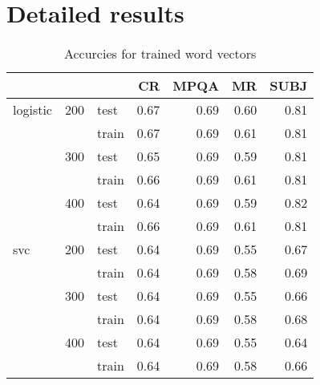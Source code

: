 \chapter{Detailed results}
\label{appendix:detailed}

\begin{table}[h]
\begin{center}

\begin{tabular}{lllrrrr}
\toprule
 & &&CR &MPQA &MR &SUBJ \\
\midrule
logistic & 200 & test & 0.67 & 0.69 & 0.60 & 0.81 \\
 & & train & 0.67 & 0.69 & 0.61 & 0.81 \\
 & 300 & test & 0.65 & 0.69 & 0.59 & 0.81 \\
 & & train & 0.66 & 0.69 & 0.61 & 0.81 \\
 & 400 & test & 0.64 & 0.69 & 0.59 & 0.82 \\
 & & train & 0.66 & 0.69 & 0.61 & 0.81 \\
svc & 200 & test & 0.64 & 0.69 & 0.55 & 0.67 \\
 & & train & 0.64 & 0.69 & 0.58 & 0.69 \\
 & 300 & test & 0.64 & 0.69 & 0.55 & 0.66 \\
 & & train & 0.64 & 0.69 & 0.58 & 0.68 \\
 & 400 & test & 0.64 & 0.69 & 0.55 & 0.64 \\
 & & train & 0.64 & 0.69 & 0.58 & 0.66 \\
\bottomrule
\end{tabular}           
\caption[Accurcies for trained word vectors]{Accurcies for trained word vectors}
\label{tab:res:trainedwordvec}
\end{center}
\end{table}


